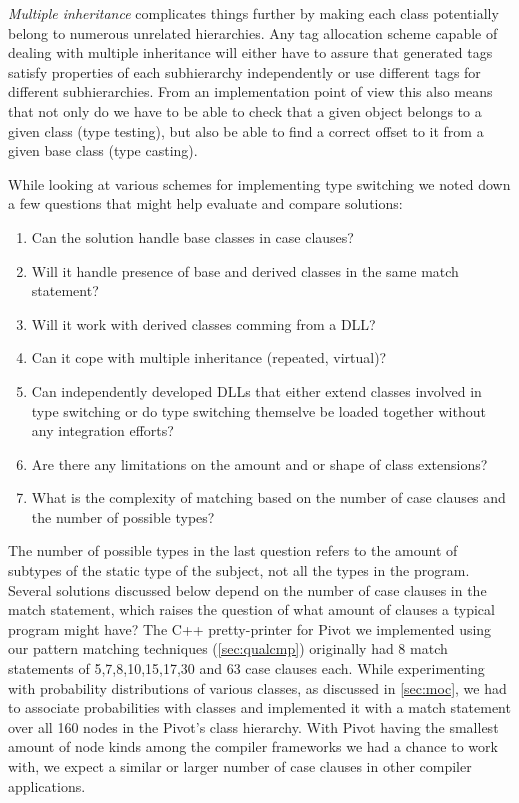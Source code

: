 \documentclass[preprint]{sigplanconf}
\begin{document}
\emph{Multiple inheritance} complicates things further by making each class 
potentially belong to numerous unrelated hierarchies. Any tag allocation scheme 
capable of dealing with multiple inheritance will either have to assure that 
generated tags satisfy properties of each subhierarchy independently or use 
different tags for different subhierarchies. From an implementation point of 
view this also means that not only do we have to be able to check that a given 
object belongs to a given class (type testing), but also be able to find a 
correct offset to it from a given base class (type casting).

While looking at various schemes for implementing type switching we noted down a 
few questions that might help evaluate and compare solutions: 

\begin{enumerate}
\setlength{\itemsep}{0pt}
\setlength{\parskip}{0pt}
\item Can the solution handle base classes in case clauses?
\item Will it handle presence of base and derived classes in the same match statement?
\item Will it work with derived classes comming from a DLL?
\item Can it cope with multiple inheritance (repeated, virtual)?
\item Can independently developed DLLs that either extend classes involved in 
      type switching or do type switching themselve be loaded together without 
      any integration efforts?
\item Are there any limitations on the amount and or shape of class extensions?
\item What is the complexity of matching based on the number of case clauses and 
      the number of possible types?
\end{enumerate}

The number of possible types in the last question refers to the amount of subtypes 
of the static type of the subject, not all the types in the program. Several 
solutions discussed below depend on the number of case clauses in the match 
statement, which raises the question of what amount of clauses a typical program 
might have? The C++ pretty-printer for Pivot we implemented using our pattern 
matching techniques (\textsection\ref{sec:qualcmp}) originally had 8 match 
statements of 5,7,8,10,15,17,30 and 63 case clauses each. While experimenting 
with probability distributions of various classes, as discussed in 
\textsection\ref{sec:moc}, we had to associate probabilities with classes and 
implemented it with a match statement over all 160 nodes in the Pivot's class 
hierarchy. With Pivot having the smallest amount of node kinds among the 
compiler frameworks we had a chance to work with, we expect a similar or larger 
number of case clauses in other compiler applications.
\end{document}

